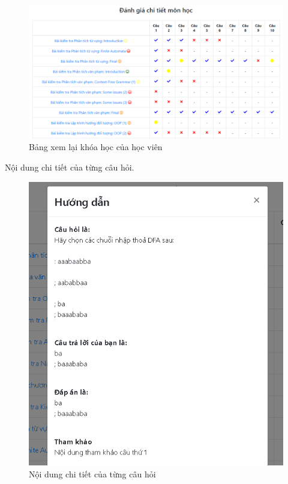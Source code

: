 \begin{center}
	\begin{figure}[htp]
		\begin{center}
			\includegraphics[width=1\linewidth]{img/33}
		\end{center}
		\caption{Bảng xem lại khóa học của học viên}
		\label{refhinh65}
	\end{figure}
\end{center}

Nội dung chi tiết của từng câu hỏi.

\begin{center}
	\begin{figure}[htp]
		\begin{center}
			\includegraphics[width=0.4\linewidth]{img/34}
		\end{center}
		\caption{Nội dung chi tiết của từng câu hỏi}
		\label{refhinh66}
	\end{figure}
\end{center}
